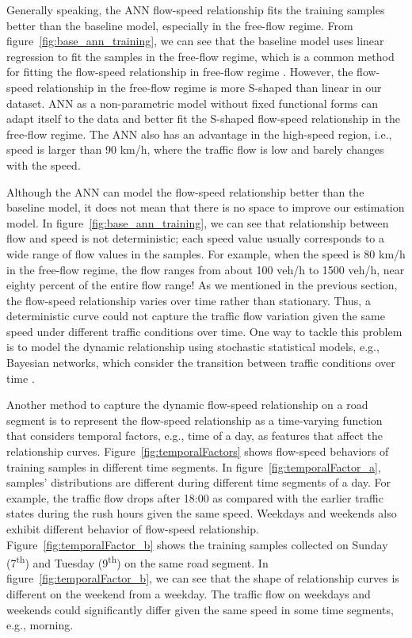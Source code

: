 \documentclass[english]{kththesis}
\begin{document}
Generally speaking, the ANN flow-speed relationship fits the training samples better than the baseline model, especially in the free-flow regime. From figure~\ref{fig:base_ann_training}, we can see that the baseline model uses linear regression to fit the samples in the free-flow regime, which is a common method for fitting the flow-speed relationship in free-flow regime \cite{blandin_individual_speed, nielsen_flow-speed_relations}. However, the flow-speed relationship in the free-flow regime is more S-shaped than linear in our dataset. ANN as a non-parametric model without fixed functional forms can adapt itself to the data and better fit the S-shaped flow-speed relationship in the free-flow regime. The ANN also has an advantage in the high-speed region, i.e., speed is larger than 90 km/h, where the traffic flow is low and barely changes with the speed.


Although the ANN can model the flow-speed relationship better than the baseline model, it does not mean that there is no space to improve our estimation model. In figure~\ref{fig:base_ann_training}, we can see that relationship between flow and speed is not deterministic; each speed value usually corresponds to a wide range of flow values in the samples. For example, when the speed is 80 km/h in the free-flow regime, the flow ranges from about 100 veh/h to 1500 veh/h, near eighty percent of the entire flow range! As we mentioned in the previous section, the flow-speed relationship varies over time rather than stationary. Thus, a deterministic curve could not capture the traffic flow variation given the same speed under different traffic conditions over time. One way to tackle this problem is to model the dynamic relationship using stochastic statistical models, e.g., Bayesian networks, which consider the transition between traffic conditions over time  \cite{neumann_bayesian}.

Another method to capture the dynamic flow-speed relationship on a road segment is to represent the flow-speed relationship as a time-varying function that considers temporal factors, e.g., time of a day, as features that affect the relationship curves. Figure~\ref{fig:temporalFactors} shows flow-speed behaviors of training samples in different time segments. In figure~\ref{fig:temporalFactor_a}, samples' distributions are different during different time segments of a day. For example, the traffic flow drops after 18:00 as compared with the earlier traffic states during the rush hours given the same speed. Weekdays and weekends also exhibit different behavior of flow-speed relationship. Figure~\ref{fig:temporalFactor_b} shows the training samples collected on Sunday (7\textsuperscript{th}) and Tuesday (9\textsuperscript{th}) on the same road segment. In figure~\ref{fig:temporalFactor_b}, we can see that the shape of relationship curves is different on the weekend from a weekday. The traffic flow on weekdays and weekends could significantly differ given the same speed in some time segments, e.g., morning.
\end{document}
